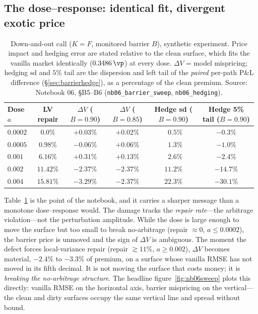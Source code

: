 \subsection{The dose--response: identical fit, divergent exotic price}

\begin{table}[htbp]\centering\small
\caption{Down-and-out call ($K{=}F$, monitored barrier $B$), synthetic experiment. Price
impact and hedging error are stated relative to the clean surface, which fits the vanilla
market identically ($0.3486\,\vp$) at every dose. $\Delta V$ = model mispricing; hedging
$\mathrm{sd}$ and $5\%$ tail are the dispersion and left tail of the \emph{paired} per-path
P\&L difference (\S\ref{sec:barrierhedge}), as a percentage of the clean premium. Source:
Notebook 06, \S B5--B6 (\texttt{nb06\_barrier\_sweep}, \texttt{nb06\_hedging}).}
\label{tab:barriersweep}
\begin{tabular}{lccccc}
\toprule
Dose $a$ & LV repair & $\Delta V$ ($B{=}0.90$) & $\Delta V$ ($B{=}0.85$) & Hedge sd ($B{=}0.90$) & Hedge 5\% tail ($B{=}0.90$) \\
\midrule
$0.0002$ & $0.0\%$    & $+0.03\%$ & $+0.02\%$ & $\phantom{0}0.5\%$  & $-0.3\%$  \\
$0.0005$ & $0.98\%$   & $-0.06\%$ & $+0.06\%$ & $\phantom{0}1.3\%$  & $-1.0\%$  \\
$0.001$  & $6.16\%$   & $+0.31\%$ & $+0.13\%$ & $\phantom{0}2.6\%$  & $-2.4\%$  \\
$0.002$  & $11.42\%$  & $-2.37\%$ & $-2.37\%$ & $11.2\%$            & $-14.7\%$ \\
$0.004$  & $15.81\%$  & $-3.29\%$ & $-2.37\%$ & $22.3\%$            & $-30.1\%$ \\
\bottomrule
\end{tabular}
\end{table}

Table~\ref{tab:barriersweep} is the point of the notebook, and it carries a sharper message
than a monotone dose--response would. The damage tracks the \emph{repair rate}---the
arbitrage violation---not the perturbation amplitude. While the dose is large enough to move
the surface but too small to break no-arbitrage (repair $\approx0$, $a\le0.0002$), the barrier
price is unmoved and the sign of $\Delta V$ is ambiguous. The moment the defect forces
local-variance repair (repair $\gtrsim11\%$, $a\ge0.002$), $\Delta V$ becomes material,
$-2.4\%$ to $-3.3\%$ of premium, on a surface whose vanilla RMSE has not moved in its fifth
decimal. It is not moving the surface that costs money; it is \emph{breaking the no-arbitrage
structure}. The headline figure~\ref{fig:nb06sweep} plots this directly: vanilla RMSE on the
horizontal axis, barrier mispricing on the vertical---the clean and dirty surfaces occupy the
same vertical line and spread without bound.

